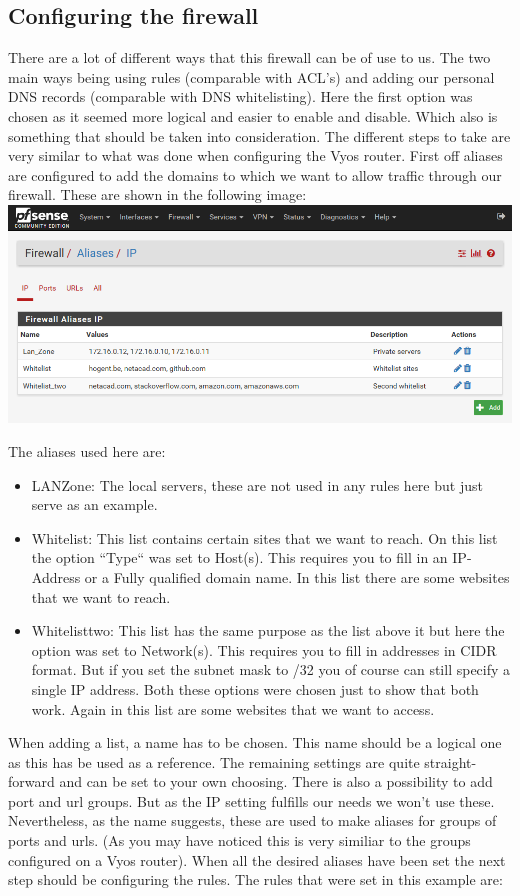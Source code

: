 \subsection{Configuring the firewall}
There are a lot of different ways that this firewall can be of use to us. The two main ways being using rules (comparable with ACL's) and adding our personal DNS records (comparable with DNS whitelisting). Here the first option was chosen as it seemed more logical and easier to enable and disable. Which also is something that should be taken into consideration.
The different steps to take are very similar to what was done when configuring the Vyos router. First off aliases are configured to add the domains to which we want to allow traffic through our firewall. These are shown in the following image:
\includegraphics[width=\textwidth]{img/Pfsense_Alias.png}

The aliases used here are:
\begin{itemize}
\item LAN\textunderscore Zone: The local servers, these are not used in any rules here but just serve as an example.
\item Whitelist: This list contains certain sites that we want to reach. On this list the option ``Type`` was set to Host(s). This requires you to fill in an IP-Address or a Fully qualified domain name. In this list there are some websites that we want to reach.
\item Whitelist\textunderscore two: This list has the same purpose as the list above it but here the option was set to Network(s). This requires you to fill in addresses in CIDR format. But if you set the subnet mask to /32 you of course can still specify a single IP address. Both these options were chosen just to show that both work. Again in this list are some websites that we want to access.
\end{itemize}
When adding a list, a name has to be chosen. This name should be a logical one as this has be used as a reference. The remaining settings are quite straight-forward and  can be set to your own choosing.
There is also a possibility to add port and url groups. But as the IP setting fulfills our needs we won't use these. Nevertheless, as the name suggests, these are used to make aliases for groups of ports and urls. (As you may have noticed this is very similiar to the groups configured on a Vyos router).
When all the desired aliases have been set the next step should be configuring the rules. The rules that were set in this example are:

